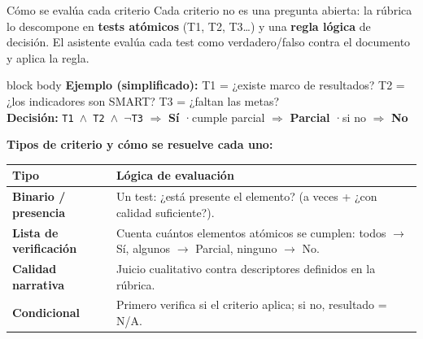 \documentclass[aspectratio=169,11pt]{beamer}
\newcommand{\redlead}[1]{\textbf{\color{iloRed}#1}}
\newcommand{\bluelead}[1]{\textbf{\color{iloBlue}#1}}
\begin{document}
\begin{frame}{Cómo se evalúa cada criterio}
  \small
  Cada criterio no es una pregunta abierta: la rúbrica lo descompone en \bluelead{tests atómicos} (T1, T2, T3\dots) y una \bluelead{regla lógica} de decisión. El asistente evalúa cada test como verdadero/falso contra el documento y aplica la regla.
  \vspace{0.15cm}
  \begin{beamercolorbox}[wd=\textwidth,sep=6pt]{block body}
    \footnotesize
    \textbf{Ejemplo (simplificado):} T1 = ¿existe marco de resultados? \quad T2 = ¿los indicadores son SMART? \quad T3 = ¿faltan las metas?\\
    \textbf{Decisión:} \texttt{T1 $\wedge$ T2 $\wedge$ $\neg$T3} $\Rightarrow$ \bluelead{Sí} \quad·\quad cumple parcial $\Rightarrow$ \textbf{Parcial} \quad·\quad si no $\Rightarrow$ \redlead{No}
  \end{beamercolorbox}
  \vspace{0.1cm}
  \textbf{Tipos de criterio y cómo se resuelve cada uno:}
  \renewcommand{\arraystretch}{1.2}
  \begin{tabular}{@{}p{3.2cm}p{9.0cm}@{}}
    \toprule
    \rowcolor{iloBlue}\color{white}\textbf{Tipo} & \color{white}\textbf{Lógica de evaluación}\\
    \midrule
    \bluelead{Binario / presencia} & Un test: ¿está presente el elemento? (a veces + ¿con calidad suficiente?).\\
    \rowcolor{iloGrayLt}\bluelead{Lista de verificación} & Cuenta cuántos elementos atómicos se cumplen: todos $\to$ Sí, algunos $\to$ Parcial, ninguno $\to$ No.\\
    \bluelead{Calidad narrativa} & Juicio cualitativo contra descriptores definidos en la rúbrica.\\
    \rowcolor{iloGrayLt}\bluelead{Condicional} & Primero verifica si el criterio aplica; si no, resultado = N/A.\\
    \bottomrule
  \end{tabular}
\end{frame}
\end{document}
